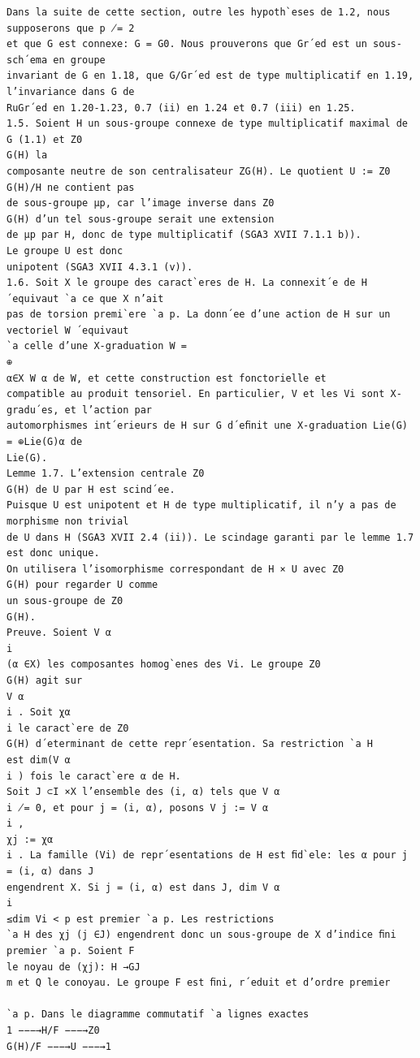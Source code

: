 \documentclass[10pt]{article}
\begin{document}
\begin{verbatim}
Dans la suite de cette section, outre les hypoth`eses de 1.2, nous supposerons que p ̸= 2
et que G est connexe: G = G0. Nous prouverons que Gr´ed est un sous-sch´ema en groupe
invariant de G en 1.18, que G/Gr´ed est de type multiplicatif en 1.19, l’invariance dans G de
RuGr´ed en 1.20-1.23, 0.7 (ii) en 1.24 et 0.7 (iii) en 1.25.
1.5. Soient H un sous-groupe connexe de type multiplicatif maximal de G (1.1) et Z0
G(H) la
composante neutre de son centralisateur ZG(H). Le quotient U := Z0
G(H)/H ne contient pas
de sous-groupe µp, car l’image inverse dans Z0
G(H) d’un tel sous-groupe serait une extension
de µp par H, donc de type multiplicatif (SGA3 XVII 7.1.1 b)).
Le groupe U est donc
unipotent (SGA3 XVII 4.3.1 (v)).
1.6. Soit X le groupe des caract`eres de H. La connexit´e de H ´equivaut `a ce que X n’ait
pas de torsion premi`ere `a p. La donn´ee d’une action de H sur un vectoriel W ´equivaut
`a celle d’une X-graduation W =
⊕
α∈X W α de W, et cette construction est fonctorielle et
compatible au produit tensoriel. En particulier, V et les Vi sont X-gradu´es, et l’action par
automorphismes int´erieurs de H sur G d´eﬁnit une X-graduation Lie(G) = ⊕Lie(G)α de
Lie(G).
Lemme 1.7. L’extension centrale Z0
G(H) de U par H est scind´ee.
Puisque U est unipotent et H de type multiplicatif, il n’y a pas de morphisme non trivial
de U dans H (SGA3 XVII 2.4 (ii)). Le scindage garanti par le lemme 1.7 est donc unique.
On utilisera l’isomorphisme correspondant de H × U avec Z0
G(H) pour regarder U comme
un sous-groupe de Z0
G(H).
Preuve. Soient V α
i
(α ∈X) les composantes homog`enes des Vi. Le groupe Z0
G(H) agit sur
V α
i . Soit χα
i le caract`ere de Z0
G(H) d´eterminant de cette repr´esentation. Sa restriction `a H
est dim(V α
i ) fois le caract`ere α de H.
Soit J ⊂I ×X l’ensemble des (i, α) tels que V α
i ̸= 0, et pour j = (i, α), posons V j := V α
i ,
χj := χα
i . La famille (Vi) de repr´esentations de H est ﬁd`ele: les α pour j = (i, α) dans J
engendrent X. Si j = (i, α) est dans J, dim V α
i
≤dim Vi < p est premier `a p. Les restrictions
`a H des χj (j ∈J) engendrent donc un sous-groupe de X d’indice ﬁni premier `a p. Soient F
le noyau de (χj): H →GJ
m et Q le conoyau. Le groupe F est ﬁni, r´eduit et d’ordre premier

`a p. Dans le diagramme commutatif `a lignes exactes
1 −−−→H/F −−−→Z0
G(H)/F −−−→U −−−→1




\end{verbatim}
\end{document}
